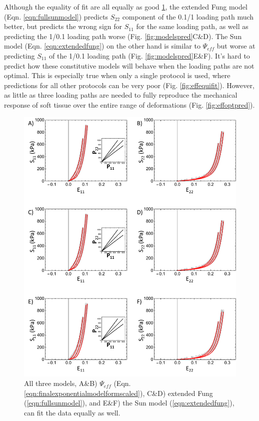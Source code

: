 	Although the equality of fit are all equally as good \ref{fig:modelsfit}, the extended Fung model (Eqn. \ref{eqn:fullsunmodel}) predicts $S_{22}$ component of the 0.1/1 loading path much better, but predicts the wrong sign for $S_{11}$ for the same loading path, as well as predicting the 1/0.1 loading path worse (Fig. \ref{fig:modelspred}C\&D). The Sun model (Eqn. \ref{eqn:extendedfung}) on the other hand is similar to $\Psi_{eff}$ but worse at predicting $S_{11}$ of the 1/0.1 loading path (Fig. \ref{fig:modelspred}E\&F). It's hard to predict how these constitutive models will behave when the loading paths are not optimal. This is especially true when only a single protocol is used, where predictions for all other protocols can be very poor (Fig. \ref{fig:effequifit}). However, as little as three loading paths are needed to fully reproduce the mechanical response of soft tissue over the entire range of deformations (Fig. \ref{fig:effoptpred}).
\begin{figure}[!hbtp]
\centering
\includegraphics[width=6.5in]{Figures/modelsfit}
\caption{All three models, A\&B) $\Psi_{eff}$ (Eqn. \ref{eqn:finalexponentialmodelformscaled}), C\&D) extended Fung (\ref{eqn:fullsunmodel}), and E\&F) the Sun model (\ref{eqn:extendedfung}), can fit the data equally as well.}
\label{fig:modelsfit}
\end{figure} 

